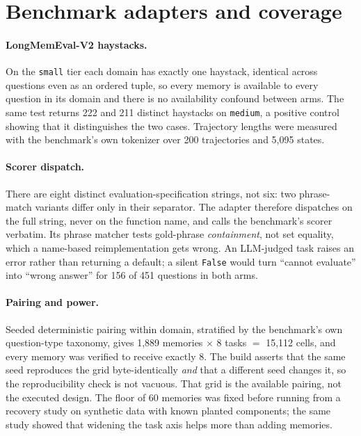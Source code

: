 \section{Benchmark adapters and coverage}
\label{sec:benchdetails}

\paragraph{LongMemEval-V2 haystacks.}
On the \texttt{small} tier each domain has exactly one haystack, identical
across questions even as an ordered tuple, so every memory is available to
every question in its domain and there is no availability confound between
arms. The same test returns 222 and 211 distinct haystacks on
\texttt{medium}, a positive control showing that it distinguishes the two
cases. Trajectory lengths were measured with the benchmark's own tokenizer
over 200 trajectories and 5{,}095 states.

\paragraph{Scorer dispatch.}
There are eight distinct evaluation-specification strings, not six: two
phrase-match variants differ only in their separator. The adapter therefore
dispatches on the full string, never on the function name, and calls the
benchmark's scorer verbatim. Its phrase matcher tests gold-phrase
\emph{containment}, not set equality, which a name-based reimplementation
gets wrong. An LLM-judged task raises an error rather than returning a
default; a silent \texttt{False} would turn ``cannot evaluate'' into ``wrong
answer'' for 156 of 451 questions in both arms.

\paragraph{Pairing and power.}
Seeded deterministic pairing within domain, stratified by the benchmark's own
question-type taxonomy, gives 1{,}889 memories $\times$ 8 tasks $=$ 15{,}112
cells, and every memory was verified to receive exactly 8. The build asserts
that the same seed reproduces the grid byte-identically \emph{and} that a
different seed changes it, so the reproducibility check is not vacuous. That
grid is the available pairing, not the executed design. The floor of 60
memories was fixed before running from a recovery study on synthetic data
with known planted components; the same study showed that widening the task
axis helps more than adding memories.

